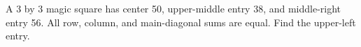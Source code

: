 A 3 by 3 magic square has center 50, upper-middle entry 38, and middle-right entry 56. All row, column, and main-diagonal sums are equal. Find the upper-left entry.
